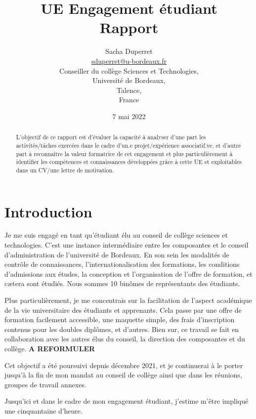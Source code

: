 \documentclass{article}
\title{{\huge UE Engagement étudiant\\Rapport}}
\author{$ $\\{\LARGE Sacha Duperret}\\ $ $\\ \href{mailto:sduperret@u-bordeaux.fr}{sduperret@u-bordeaux.fr}\\Conseiller du collège Sciences et Technologies,\\Université de Bordeaux,\\Talence,\\France}
\date{7 mai 2022}
\begin{document}
\maketitle

\vspace{20pt}

\tableofcontents

\vspace{50pt}

\begin{abstract}
L'objectif de ce rapport est d'évaluer la capacité à analyser d’une part les activités/tâches exercées dans le cadre d'un.e projet/expérience associatif.ve, et d’autre part à reconnaître la valeur formatrice de cet engagement et plus particulièrement à identifier les compétences et connaissances développées grâce à cette UE et exploitables dans un CV/une lettre de motivation.
\end{abstract}

\newpage \section*{Introduction}

Je me suis engagé en tant qu'étudiant élu au conseil de collège sciences et technologies. 
C'est une instance intermédiaire entre les composantes et le conseil d'administration de l'université de Bordeaux. 
En son sein les modalités de contrôle de connaissances, l'internationalisation des formations, les conditions d'admissions aux études, la conception et l'organisation de l'offre de formation, et cætera sont étudiés. 
Nous sommes 10 binômes de représentants des étudiants.

Plus particulièrement, je me concentrais sur la facilitation de l'aspect académique de la vie universitaire des étudiants et apprenants. 
Cela passe par une offre de formation facilement accessible, une maquette simple, des frais d'inscription contenus pour les doubles diplômes, et d'autres. 
Bien sur, ce travail se fait en collaboration avec les autres élus du conseil, la direction des composantes et du collège. \textbf{A REFORMULER}

Cet objectif a été poursuivi depuis décembre 2021, et je continuerai à le porter jusqu'à la fin de mon mandat au conseil de collège ainsi que dans les réunions, groupes de travail annexes.

\newpage
Jusqu'ici et dans le cadre de mon engagement étudiant, j'estime m'être impliqué une cinquantaine d'heure.
\end{document}
